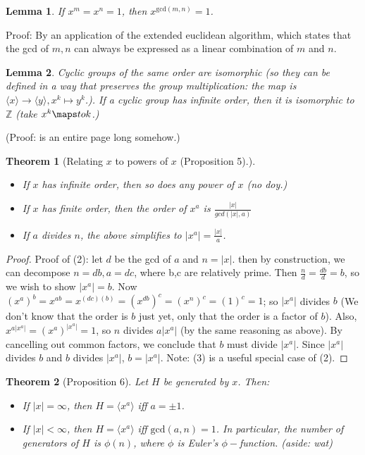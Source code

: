 \documentclass[1    0pt, answers]{exam} \renewcommand{\baselinestretch}{1.05}
\theoremstyle{plain}
\newtheorem{theorem}{Theorem}
\newtheorem{lemma}{Lemma}
\theoremstyle{definition}
\begin{document}
\begin{questions}
\begin{lemma}
If $x^m = x^n = 1$, then $x^{\text{gcd}(m,n)} = 1$. 
\end{lemma}
Proof: By an application of the extended euclidean algorithm, which states that the gcd of $m,n$ can always be expressed as a linear combination of $m$ and $n$.

\begin{lemma} Cyclic groups of the same order are isomorphic (so they can be defined in a way that preserves the group multiplication: the map is $\langle x \rangle \to \langle y \rangle, x^k \mapsto y^k$.). If a cyclic group has infinite order, then it is isomorphic to $\mathbb{Z}$ (take $x^k \maps to k$.)
\end{lemma} 
(Proof: is an entire page long somehow.)

\begin{theorem}[Relating $x$ to powers of $x$ (Proposition 5).]
\begin{itemize}
     \item If $x$ has infinite order, then so does any power of $x$ (no doy.)
     \item If $x$ has finite order, then the order of $x^a$ is $\frac{|x|}{gcd(|x|, a)}$
     \item If $a$ divides $n$, the above simplifies to $|x^a| = \frac{|x|}{a}$.
\end{itemize}
\end{theorem}
\begin{proof}
Proof of (2): let $d$ be the gcd of $a$ and $n = |x|$. then by construction, we can decompose  $n = db, a = dc$, where b,c are relatively prime. 
Then $\frac{n}{d} = \frac{db}{d} = b$, so we wish to show $|x^a| = b$. Now $(x^{a})^{b} = x^{ab} = x^{(dc)(b)} = (x^{db})^{c} = (x^{n})^{c} = (1)^c = 1$; so $|x^a|$ divides $b$ (We don't know that the order is $b$ just yet, only that the order is a factor of $b$).
Also, $x^{a|x^a|} = (x^a)^{|x^a|} = 1$, so $n$ divides $a |x^a|$ (by the same reasoning as above). By cancelling out common factors, we conclude that $b$ must divide $|x^a|$.
Since $|x^a|$ divides $b$ and $b$ divides $|x^a|$, $b = |x^a|$.
Note: (3) is a useful special case of (2).
\end{proof}
\begin{theorem}[Proposition 6]
Let $H$ be generated by $x$. Then:
\begin{itemize}
\item If $|x| = \infty$, then $H = \langle x^a \rangle$ iff $a = \pm 1$.
\item If $|x| < \infty$, then $H = \langle x^a \rangle$ iff $\text{gcd}(a,n) = 1$. In particular, the number of generators of $H$ is $\phi(n)$, where $\phi$ is Euler's $\phi-$function. (aside: wat)

\end{itemize}
\end{theorem}
\end{questions}
\end{document}
